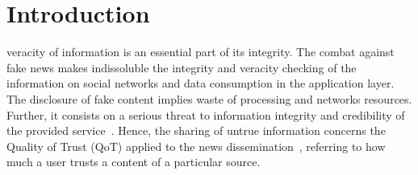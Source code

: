 \documentclass{ieeeaccess}
\begin{document}
\section{Introduction}
\label{sec:introduction}
 veracity of information is an essential part of its integrity. The combat against fake news makes indissoluble the integrity and veracity checking of the information on social networks and data consumption in the application layer. 
The disclosure of fake content implies waste of processing and networks resources. Further, it consists on a serious threat to information integrity and credibility of the provided service~\cite{nicollasspl2020}. Hence, the sharing of untrue information concerns the Quality of Trust (QoT) applied to the news dissemination~\cite{liu2010quality}, referring to how much a user trusts a content of a particular source. 

\end{document}
